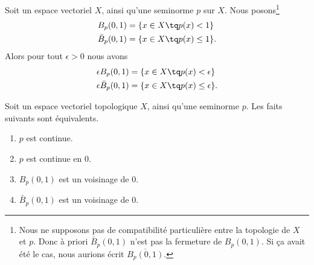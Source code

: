\begin{lemma}		\label{LEMooQSAJooCgPNnD}
	Soit un espace vectoriel \( X\), ainsi qu'une seminorme \( p\) sur \( X\). Nous posons\footnote{Nous ne supposons pas de compatibilité particulière entre la topologie de \( X\) et \( p\). Donc à priori \( \bar B_p(0,1)\) n'est pas la fermeture de \( B_p(0,1)\). Si ça avait été le cas, nous aurions écrit \( \overline{B_p(0,1)}\).}
	\begin{equation}
		\begin{aligned}[]
			B_p(0,1)      & =\{ x\in X\tq p(x)< 1 \}     \\
			\bar B_p(0,1) & =\{ x\in X\tq p(x)\leq 1 \}.
		\end{aligned}
	\end{equation}
	Alors pour tout \( \epsilon>0\) nous avons
	\begin{equation}
		\begin{aligned}[]
			\epsilon B_p(0,1)     & =\{ x\in X\tq p(x)< \epsilon \}     \\
			\epsilon\bar B_p(0,1) & =\{ x\in X\tq p(x)\leq \epsilon \}.
		\end{aligned}
	\end{equation}
\end{lemma}


\begin{proposition}		\label{PROPooDDURooJHfHLw}
	Soit un espace vectoriel topologique \( X\), ainsi qu'une seminorme \( p\). Les faits suivants sont équivalents.
	\begin{enumerate}
		\item		\label{ITEMooCAOXooGNBeSB}
		      \( p\) est continue.
		\item		\label{ITEMooWWUSooEPkoWU}
		      \( p\) est continue en \( 0\).
		\item		\label{ITEMooPKFLooTRlKwo}
		      \( B_p(0,1)\) est un voisinage de \( 0\).
		\item		\label{ITEMooRTFZooUXUVnA}
		      \( \bar B_p(0,1)\) est un voisinage de \( 0\).
	\end{enumerate}
\end{proposition}

